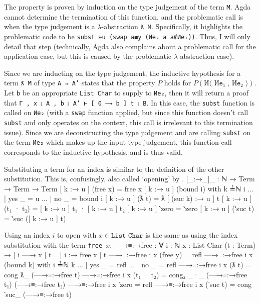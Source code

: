 \documentclass[logo,bsc,singlespacing,parskip,online]{infthesis}
\renewenvironment{code}{\mintedcopy[breaklines,breaksymbolleft=\;]{agda}}{\endmintedcopy}
\begin{document}
The property is proven by induction on the type judgement of the term \texttt{M}. Agda cannot
determine the termination of this function, and the problematic call is when the type judgement is a
$\lambda$-abstraction \texttt{ƛ M}. Specifically, it highlights the problematic code to be
\texttt{subst ⊢u (swap a≢y (Иe₂ a {a∉Иe₁}))}. Thus, I will only detail that step (technically, Agda
also complains about a problematic call for the application case, but this is caused by the
problematic $\lambda$-abstraction case).

Since we are inducting on the type judgement, the inductive hypothesis for a term \texttt{ƛ M} of
type \texttt{A ⇒ A'} states that the property $P$ holds for $P(\texttt{И⟨ Иe₁ , Иe₂ ⟩})$. Let
\texttt{b} be an appropriate \texttt{List Char} to supply to \texttt{Иe₂}, then it will return a
proof that \texttt{Γ , x ⦂ A , b ⦂ A' ⊢ [ 0 —→ b ] t ⦂ B}. In this case, the \texttt{subst} function
is called on \texttt{Иe₂} (with a \texttt{swap} function applied, but since this function doesn't
call \texttt{subst} and only operates on the context, this call is irrelevant to this termination
issue). Since we are deconstructing the type judgement and are calling \texttt{subst} on the term
\texttt{Иe₂} which makes up the input type judgement, this function call corresponds to the
inductive hypothesis, and is thus valid.

Substituting a term for an index is similar to the definition of the other substitution. This is,
confusingly, also called `opening' by \citet{chargueraud_locally_2012}.
\begin{code}
[_:→_]_ : ℕ → Term → Term → Term
[ k :→ u ] (free x) = free x
[ k :→ u ] (bound i) with k ≟ℕ i
... | yes _ = u
... | no  _ = bound i
[ k :→ u ] (ƛ t) = ƛ [ (suc k) :→ u ] t
[ k :→ u ] (t₁ · t₂) = [ k :→ u ] t₁ · [ k :→ u ] t₂
[ k :→ u ] ‵zero = ‵zero
[ k :→ u ] (‵suc t) = ‵suc ([ k :→ u ] t)
\end{code}

Using an index $i$ to open with $x \in \texttt{List Char}$ is the same as using the index
substitution with the term \texttt{free $x$}.
\begin{code}
—→≡:→free : ∀ {i : ℕ} {x : List Char} (t : Term)
  → [ i —→ x ] t ≡ [ i :→ free x ] t
—→≡:→free {i} {x} (free y) = refl
—→≡:→free {i} {x} (bound k) with i ≟ℕ k
... | yes _ = refl
... | no  _ = refl
—→≡:→free {i} {x} (ƛ t) = cong ƛ_ (—→≡:→free t)
—→≡:→free {i} {x} (t₁ · t₂) =
  cong₂ _·_ (—→≡:→free t₁) (—→≡:→free t₂)
—→≡:→free {i} {x} ‵zero = refl
—→≡:→free {i} {x} (‵suc t) = cong ‵suc_ (—→≡:→free t)
\end{code}
\end{document}
